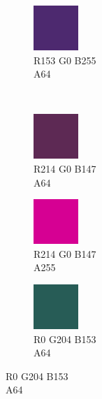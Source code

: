 \begin{figure}[!h]
\begin{subfigure}{0.105\textwidth}
	\end{subfigure}
	\begin{subfigure}{0.105\textwidth}\centering
		\includegraphics[scale=1, frame]{gui-imgs/R153G0B255A64}
		\vspace*{-20px} \caption*{\hspace*{-0.25px}\tiny R153 G0 B255 \\ \tiny A64}
	\end{subfigure} \\
	\begin{subfigure}{0.105\textwidth}\centering
		\includegraphics[scale=1, frame]{gui-imgs/R214G0B147A64}
		\vspace*{-20px}\caption*{\hspace*{-0.25px}\tiny R214 G0 B147 \\ \tiny A64}
	\end{subfigure}
	\begin{subfigure}{0.105\textwidth}\centering
		\includegraphics[scale=1, frame]{gui-imgs/R214G0B147A255}
		\vspace*{-20px} \caption*{\hspace*{-0.25px}\tiny R214 G0 B147 \\ \tiny A255}
	\end{subfigure}
	\begin{subfigure}{0.105\textwidth}\centering
		\includegraphics[scale=1, frame]{gui-imgs/R0G204B153A64}
		\vspace*{-20px} \caption*{\hspace*{-0.25px}\tiny R0 G204 B153 \\ \tiny A64}
	\end{subfigure}

\end{figure}

